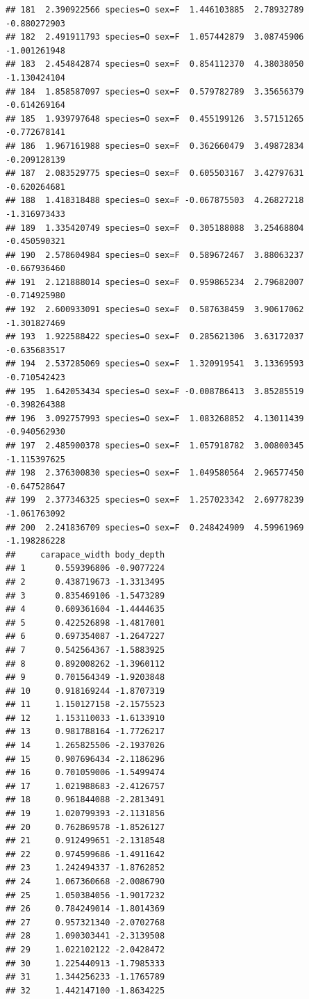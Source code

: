 \documentclass{beamer}\usepackage[]{graphicx}\usepackage[]{color}
\makeatletter
\newenvironment{kframe}{%
 \def\at@end@of@kframe{}%
 \ifinner\ifhmode%
  \def\at@end@of@kframe{\end{minipage}}%
  \begin{minipage}{\columnwidth}%
 \fi\fi%
 \def\FrameCommand##1{\hskip\@totalleftmargin \hskip-\fboxsep
 \colorbox{shadecolor}{##1}\hskip-\fboxsep
     \hskip-\linewidth \hskip-\@totalleftmargin \hskip\columnwidth}%
 \MakeFramed {\advance\hsize-\width
   \@totalleftmargin\z@ \linewidth\hsize
   \@setminipage}}%
 {\par\unskip\endMakeFramed%
 \at@end@of@kframe}
\newenvironment{knitrout}{}{} %
\makeatother
\begin{document}
\begin{frame}[fragile]
\begin{knitrout}
\begin{kframe}
\begin{verbatim}
## 181  2.390922566 species=O sex=F  1.446103885  2.78932789    -0.880272903
## 182  2.491911793 species=O sex=F  1.057442879  3.08745906    -1.001261948
## 183  2.454842874 species=O sex=F  0.854112370  4.38038050    -1.130424104
## 184  1.858587097 species=O sex=F  0.579782789  3.35656379    -0.614269164
## 185  1.939797648 species=O sex=F  0.455199126  3.57151265    -0.772678141
## 186  1.967161988 species=O sex=F  0.362660479  3.49872834    -0.209128139
## 187  2.083529775 species=O sex=F  0.605503167  3.42797631    -0.620264681
## 188  1.418318488 species=O sex=F -0.067875503  4.26827218    -1.316973433
## 189  1.335420749 species=O sex=F  0.305188088  3.25468804    -0.450590321
## 190  2.578604984 species=O sex=F  0.589672467  3.88063237    -0.667936460
## 191  2.121888014 species=O sex=F  0.959865234  2.79682007    -0.714925980
## 192  2.600933091 species=O sex=F  0.587638459  3.90617062    -1.301827469
## 193  1.922588422 species=O sex=F  0.285621306  3.63172037    -0.635683517
## 194  2.537285069 species=O sex=F  1.320919541  3.13369593    -0.710542423
## 195  1.642053434 species=O sex=F -0.008786413  3.85285519    -0.398264388
## 196  3.092757993 species=O sex=F  1.083268852  4.13011439    -0.940562930
## 197  2.485900378 species=O sex=F  1.057918782  3.00800345    -1.115397625
## 198  2.376300830 species=O sex=F  1.049580564  2.96577450    -0.647528647
## 199  2.377346325 species=O sex=F  1.257023342  2.69778239    -1.061763092
## 200  2.241836709 species=O sex=F  0.248424909  4.59961969    -1.198286228
##     carapace_width body_depth
## 1      0.559396806 -0.9077224
## 2      0.438719673 -1.3313495
## 3      0.835469106 -1.5473289
## 4      0.609361604 -1.4444635
## 5      0.422526898 -1.4817001
## 6      0.697354087 -1.2647227
## 7      0.542564367 -1.5883925
## 8      0.892008262 -1.3960112
## 9      0.701564349 -1.9203848
## 10     0.918169244 -1.8707319
## 11     1.150127158 -2.1575523
## 12     1.153110033 -1.6133910
## 13     0.981788164 -1.7726217
## 14     1.265825506 -2.1937026
## 15     0.907696434 -2.1186296
## 16     0.701059006 -1.5499474
## 17     1.021988683 -2.4126757
## 18     0.961844088 -2.2813491
## 19     1.020799393 -2.1131856
## 20     0.762869578 -1.8526127
## 21     0.912499651 -2.1318548
## 22     0.974599686 -1.4911642
## 23     1.242494337 -1.8762852
## 24     1.067360668 -2.0086790
## 25     1.050384056 -1.9017232
## 26     0.784249014 -1.8014369
## 27     0.957321340 -2.0702768
## 28     1.090303441 -2.3139508
## 29     1.022102122 -2.0428472
## 30     1.225440913 -1.7985333
## 31     1.344256233 -1.1765789
## 32     1.442147100 -1.8634225

\end{verbatim}
\end{kframe}
\end{knitrout}
\end{frame}
\end{document}
